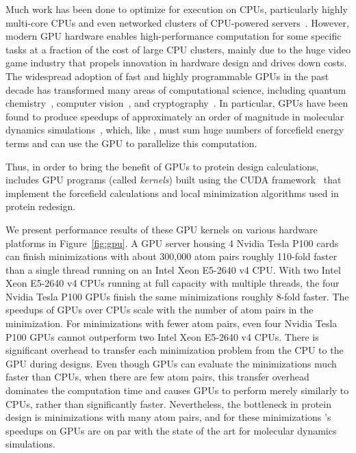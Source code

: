 Much work has been done to optimize \osprey for execution on CPUs, particularly highly multi-core CPUs and even networked clusters of CPU-powered servers~\cite{minBounds_DACS,cloud_OSPREY}. However, modern GPU hardware enables high-performance computation for some specific tasks at a fraction of the cost of large CPU clusters, mainly due to the huge video game industry that propels innovation in hardware design and drives down costs. The widespread adoption of fast and highly programmable GPUs in the past decade has transformed many areas of computational science, including quantum chemistry~\cite{GPU_QM}, computer vision~\cite{ResNet}, and cryptography~\cite{GPU_crypto}.  In particular, GPUs have been found to produce speedups of approximately an order of magnitude in molecular dynamics simulations~\cite{HOOMD_GPU,AMBER_GPU_microseconds,GROMACS_GPU}, which, like \osprey, must sum huge numbers of forcefield energy terms and can use the GPU to parallelize this computation.  

Thus, in order to bring the benefit of GPUs to protein design calculations,  includes GPU programs (called {\it kernels}) built using the CUDA framework~\cite{nvidia2010programming} that implement the forcefield calculations and local minimization algorithms used in protein redesign.

We present performance results of these GPU kernels on various hardware platforms in Figure~\ref{fig:gpu}. A GPU server housing 4 Nvidia Tesla P100 cards can finish minimizations with about 300,000 atom pairs roughly 110-fold faster than a single thread running on an Intel Xeon E5-2640 v4 CPU. With two Intel Xeon E5-2640 v4 CPUs running at full capacity with multiple threads, the four Nvidia Tesla P100 GPUs finish the same minimizations roughly 8-fold faster. The speedups of GPUs over CPUs scale with the number of atom pairs in the minimization. For minimizations with fewer atom pairs, even four Nvidia Tesla P100 GPUs cannot outperform two Intel Xeon E5-2640 v4 CPUs. There is significant overhead to transfer each minimization problem from the CPU to the GPU during designs. Even though GPUs can evaluate the minimizations much faster than CPUs, when there are few atom pairs, this transfer overhead dominates the computation time and causes GPUs to perform merely similarly to CPUs, rather than significantly faster.  Nevertheless, the bottleneck in protein design is minimizations with many atom pairs, and for these minimizations \osprey's speedups on GPUs are on par with the state of the art for molecular dynamics simulations.  


